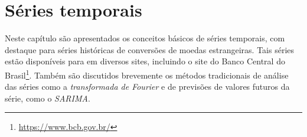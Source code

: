 

\chapter{Séries temporais}
\label{cap:series}

Neste capítulo são apresentados os conceitos básicos de séries temporais, com destaque para séries históricas de conversões de moedas estrangeiras. Tais séries estão disponíveis para  em diversos sites, incluindo o site do Banco Central do Brasil\footnote{\url{https://www.bcb.gov.br/}}. Também são discutidos brevemente os métodos tradicionais de análise das séries como a \emph{transformada de Fourier} e de previsões de valores futuros da série, como o \emph{SARIMA}.